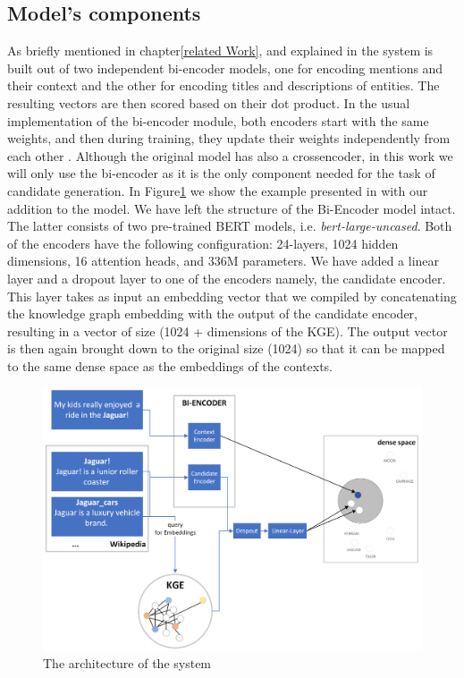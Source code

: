 \subsection{Model's components}
As briefly mentioned in chapter\ref{related Work}, and explained in \cite{Wu2020} the system is built out of two independent bi-encoder models, one for encoding mentions and their context and the other for encoding titles and descriptions of entities. The resulting vectors are then scored based on their dot product.\newline
In the usual implementation of the bi-encoder module, both encoders start with the same weights, and then during training, they update their weights independently from each other \cite{biencoder}.
Although the original model has also a crossencoder, in this work we will only use the bi-encoder as it is the only component needed for the task of candidate generation.\newline
In Figure\ref{BlinkMod} we show the example presented in \cite{Wu2020} with our addition to the model. We have left the structure of the Bi-Encoder model intact.
The latter consists of two pre-trained BERT models, i.e. \textit{bert-large-uncased}. Both of the encoders have the following configuration: 24-layers, 1024 hidden dimensions, 16 attention heads, and 336M parameters.\newline 
We have added a linear layer and a dropout layer to one of the encoders namely, the candidate encoder. This layer takes as input an embedding vector that we compiled by concatenating the knowledge graph embedding with the output of the candidate encoder, resulting in a vector of size (1024 + dimensions of the KGE). The output vector is then again brought down to the original size (1024) so that it can be mapped to the same dense space as the embeddings of the contexts.\newline


\begin{figure}[h]
\centering
\includegraphics[width=12cm]{figures/NewBlinkVersion.png}
\caption{The architecture of the system}
\label{BlinkMod}
\end{figure}


